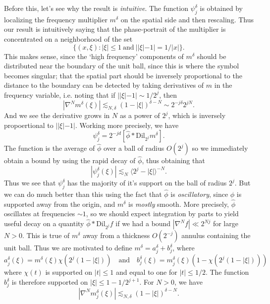 %
Before this, let's see why the result is \emph{intuitive}. The function $\psi^\delta_j$ is obtained by localizing the frequency multiplier $m^\delta$ on the spatial side and then rescaling. Thus our result is intuitively saying that the phase-portrait of the multiplier is concentrated on a neighborhood of the set
%
\[ \{ (x,\xi) : |\xi| \leq 1\ \text{and}\ ||\xi| - 1| = 1/|x| \}. \]
%
This makes sense, since the `high frequency' components of $m^\delta$ should be distributed near the boundary of the unit ball, since this is where the symbol becomes singular; that the spatial part should be inversely proportional to the distance to the boundary can be detected by taking derivatives of $m$ in the frequency variable, i.e. noting that if $||\xi| - 1| \sim 1/2^j$, then
%
\[ |\nabla^N m^\delta(\xi)| \lesssim_{N,\delta} (1 - |\xi|)^{\delta - N} \sim 2^{-j \delta} 2^{jN}. \]
%
And we see the derivative grows in $N$ as a power of $2^j$, which is inversely propoertional to $||\xi| - 1|$. Working more precisely, we have
%
\[ \psi^\delta_j = 2^{-jd} \left[ \widehat{\phi} * \text{Dil}_{2^j} m^\delta \right]. \]
%
The function is the average of $\widehat{\phi}$ over a ball of radius $O(2^j)$ so we immediately obtain a bound by using the rapid decay of $\widehat{\phi}$, thus obtaining that
%
\[ |\psi^\delta_j(\xi)| \lesssim_N \langle 2^j - |\xi| \rangle^{-N}. \]
% 
Thus we see that $\psi^\delta_j$ has the majority of it's support on the ball of radius $2^j$. But we can do much better than this using the fact that $\widehat{\phi}$ is \emph{oscillatory}, since $\phi$ is supported away from the origin, and $m^\delta$ is \emph{mostly} smooth. More precisely, $\widehat{\phi}$ oscillates at frequencies $\sim 1$, so we should expect integration by parts to yield useful decay on a quantity $\widehat{\phi} * \text{Dil}_{2^j} f$ if we had a bound $|\nabla^N f| \ll 2^{Nj}$ for large $N > 0$. This is true of $m^\delta$ away from a thickness $O(2^{-j})$ annulus containing the unit ball. Thus we are motivated to define $m^\delta = a^\delta_j + b^\delta_j$, where
%
\[ a^\delta_j(\xi) = m^\delta(\xi) \chi( 2^j (1 - |\xi|)) \quad\text{and}\quad b^\delta_j(\xi) = m^\delta_j(\xi) ( 1 - \chi( 2^j (1 - |\xi|)) ) \]
%
where $\chi(t)$ is supported on $|t| \leq 1$ and equal to one for $|t| \leq 1/2$. The function $b^\delta_j$ is therefore supported on $|\xi| \leq 1 - 1/2^{j+1}$. For $N > 0$, we have
% 
\[ |\nabla^N m^\delta_j(\xi)| \lesssim_{N,\delta} (1 - |\xi|)^{\delta-N}. \]
